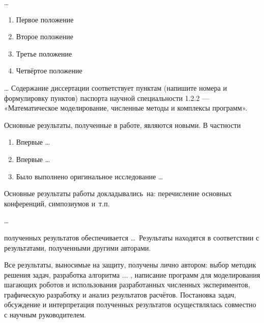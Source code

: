 {\methods} \ldots

{}
\begin{enumerate}[beginpenalty=10000] %
	\item Первое положение
	\item Второе положение
	\item Третье положение
	\item Четвёртое положение
\end{enumerate}

{\compliances} \ldots
Содержание диссертации соответствует пунктам (напишите номера и формулировку
пунктов) паспорта научной специальности 1.2.2 — «Математическое моделирование,
численные методы и комплексы программ».

{\novelty}
Основные результаты, полученные в работе, являются новыми. В частности
\begin{enumerate}[beginpenalty=10000] %
	\item Впервые \ldots
	\item Впервые \ldots
	\item Было выполнено оригинальное исследование \ldots
\end{enumerate}

{\probation}
Основные результаты работы докладывались~на:
перечисление основных конференций, симпозиумов и~т.\:п.

{\influence} \ldots

{\reliability} полученных результатов обеспечивается \ldots \ Результаты находятся в соответствии с результатами, полученными другими авторами.

{\contribution} Все результаты, выносимые на защиту, получены лично автором: выбор методик решения задач, разработка алгоритма ... , написание программ для моделирования шагающих роботов и использования разработанных численных экспериментов, графическую разработку и анализ результатов расчётов. Постановка задач, обсуждение и интерпретация полученных результатов осуществлялась совместно с научным руководителем.
